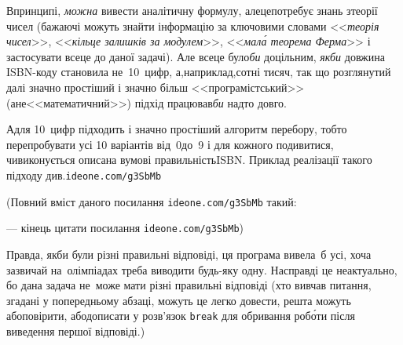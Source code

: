\documentclass[14pt,a4paper]{extarticle}
\renewcommand{\baselinestretch}{1.3125}
\begin{document}
{
\Tutorial	
В\nolinebreak[3] принципі, \emph{можна} вивести аналітичну формулу, але\nolinebreak[3] це\nolinebreak[3] потребує знань з\nolinebreak[3] теорії чисел (бажаючі можуть знайти інформацію за ключовими словами <<\emph{теорія чисел}>>, <<\emph{кільце залишків за модулем}>>, <<\emph{мал\'{а} теорема Ферма}>> і застосувати все\nolinebreak[3] це до даної задачі). Але все\nolinebreak[3] це було\nolinebreak[3] \emph{би} доцільним, \emph{якби} довжина ISBN-коду становила не~10~цифр, а,\nolinebreak[3] наприклад,\nolinebreak[3] сотні тисяч, так що розглянутий далі значно простіший і значно більш <<програмістський>> (а\nolinebreak[3] не\nolinebreak[3] <<математичний>>) підхід працював\nolinebreak[3] \emph{би} надто довго.

А\nolinebreak[3] для 10~цифр підходить і значно простіший алгоритм перебору, тобто перепробувати усі 10 варіантів від~0\nolinebreak[1] до~9 і для кожного подивитися, чи\nolinebreak[3] виконується описана в\nolinebreak[3] умові правильність\nolinebreak[3] ISBN. Приклад реалізації такого підходу див.\nolinebreak[1] 
\verb"ideone.com/g3SbMb"


{\color{green}\begin{small}

\renewcommand{\baselinestretch}{0.875}

(Повний вміст даного посилання \verb"ideone.com/g3SbMb" такий:

--- кінець цитати посилання \verb"ideone.com/g3SbMb")

\end{small}}


\hspace{0.5em plus 1em} Правда, якби були різні правильні відповіді, ця програма вивела~б усі, хоча зазвичай на~олімпіадах треба виводити будь-яку одну. Насправді це неактуально, бо дана задача не~може мати різні правильні відповіді (хто вивчав питання, згадані у попередньому абзаці, можуть це легко довести, решта можуть або\nolinebreak[3] повірити, або\nolinebreak[3] дописати у розв'язок \verb"break" для обривання роб\'{о}ти після виведення першої відповіді.)

}
\end{document}
